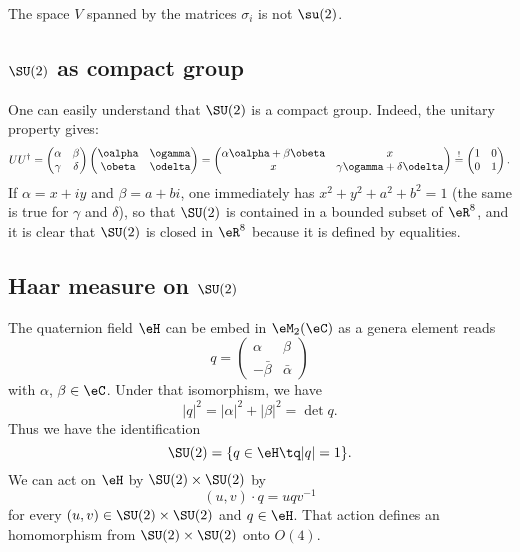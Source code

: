 The space \( V\) spanned by the matrices \( \sigma_i\) is not \( \su(2)\).

\subsection{\texorpdfstring{$ \SU(2)$}{SU(2)} as compact group}

One can easily understand that $\SU(2)$ is a compact group. Indeed, the unitary property gives:
\[
UU^{\dag}=
\begin{pmatrix}
\alpha & \beta \\
\gamma & \delta
\end{pmatrix}
\begin{pmatrix}
\oalpha & \ogamma \\
\obeta & \odelta
\end{pmatrix}
=
\begin{pmatrix}
\alpha\oalpha+\beta\obeta & x \\
x & \gamma\ogamma+\delta\odelta
\end{pmatrix}
\stackrel{!}{=}
\begin{pmatrix}
1  & 0 \\
0 & 1
\end{pmatrix}.
\]
If $\alpha=x+iy$ and $\beta=a+bi$, one immediately has  $x^2+y^2+a^2+b^2=1$ (the same is true for $\gamma$ and $\delta$), so that $\SU(2)$ is contained in a bounded subset of $\eR^8$, and it is clear that $\SU(2)$ is closed in $\eR^8$ because it is defined by equalities.

					\subsection{Haar measure on \texorpdfstring{$\SU(2)$}{SU2}}

The quaternion field $\eH$ can be embed in $\eM_2(\eC)$ as a genera element reads
\begin{equation}
	q=
\begin{pmatrix}
  \alpha	&	\beta	\\
  -\bar\beta	&	\bar\alpha
\end{pmatrix}
\end{equation}
with $\alpha$, $\beta\in\eC$. Under that isomorphism, we have
\[
	| q |^2=| \alpha |^2+| \beta |^2=\det q.
\]
Thus we have the identification
\begin{equation}
	\SU(2)=\{ q\in\eH\tq | q |=1 \}.
\end{equation}
We can act on $\eH$ by $\SU(2)\times \SU(2)$ by
\begin{equation}
	(u,v)\cdot q=uqv^{-1}
\end{equation}
for every $(u,v)\in \SU(2)\times\SU(2)$ and $q\in\eH$. That action defines an homomorphism from $\SU(2)\times\SU(2)$ onto $O(4)$.

